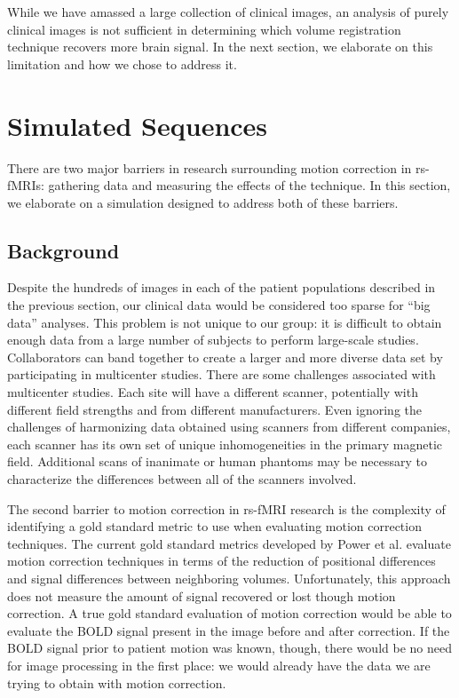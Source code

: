 While we have amassed a large collection of clinical images, an analysis of purely clinical images is not sufficient in determining which volume registration technique recovers more brain signal. In the next section, we elaborate on this limitation and how we chose to address it.

\section{Simulated Sequences} %

There are two major barriers in research surrounding motion correction in rs-fMRIs: gathering data and measuring the effects of the technique. In this section, we elaborate on a simulation designed to address both of these barriers.

\subsection{Background}

Despite the hundreds of images in each of the patient populations described in the previous section, our clinical data would be considered too sparse for ``big data'' analyses. This problem is not unique to our group: it is difficult to obtain enough data from a large number of subjects to perform large-scale studies. Collaborators can band together to create a larger and more diverse data set by participating in multicenter studies. There are some challenges associated with multicenter studies. Each site will have a different scanner, potentially with different field strengths and from different manufacturers. Even ignoring the challenges of harmonizing data obtained using scanners from different companies, each scanner has its own set of unique inhomogeneities in the primary magnetic field. Additional scans of inanimate or human phantoms may be necessary to characterize the differences between all of the scanners involved.

The second barrier to motion correction in rs-fMRI research is the complexity of identifying a gold standard metric to use when evaluating motion correction techniques. The current gold standard metrics developed by Power et al. evaluate motion correction techniques in terms of the reduction of positional differences and signal differences between neighboring volumes. Unfortunately, this approach does not measure the amount of signal recovered or lost though motion correction. A true gold standard evaluation of motion correction would be able to evaluate the BOLD signal present in the image before and after correction. If the BOLD signal prior to patient motion was known, though, there would be no need for image processing in the first place: we would already have the data we are trying to obtain with motion correction.


